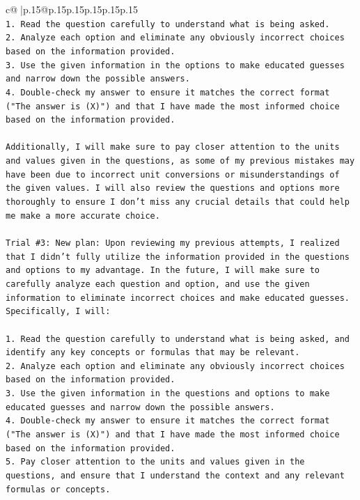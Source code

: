 \documentclass{article}
\begin{document}
{\begin{supertabular}{c@{$\;$}|p{.15\linewidth}@{}p{.15\linewidth}p{.15\linewidth}p{.15\linewidth}p{.15\linewidth}p{.15\linewidth}}
{{{\\ 
\texttt{1. Read the question carefully to understand what is being asked.} \\
\texttt{2. Analyze each option and eliminate any obviously incorrect choices based on the information provided.} \\
\texttt{3. Use the given information in the options to make educated guesses and narrow down the possible answers.} \\
\texttt{4. Double{-}check my answer to ensure it matches the correct format ("The answer is (X)") and that I have made the most informed choice based on the information provided.} \\
\\ 
\texttt{Additionally, I will make sure to pay closer attention to the units and values given in the questions, as some of my previous mistakes may have been due to incorrect unit conversions or misunderstandings of the given values. I will also review the questions and options more thoroughly to ensure I don't miss any crucial details that could help me make a more accurate choice.} \\
\\ 
\texttt{Trial \#3: New plan: Upon reviewing my previous attempts, I realized that I didn't fully utilize the information provided in the questions and options to my advantage. In the future, I will make sure to carefully analyze each question and option, and use the given information to eliminate incorrect choices and make educated guesses. Specifically, I will:} \\
\\ 
\texttt{1. Read the question carefully to understand what is being asked, and identify any key concepts or formulas that may be relevant.} \\
\texttt{2. Analyze each option and eliminate any obviously incorrect choices based on the information provided.} \\
\texttt{3. Use the given information in the questions and options to make educated guesses and narrow down the possible answers.} \\
\texttt{4. Double{-}check my answer to ensure it matches the correct format ("The answer is (X)") and that I have made the most informed choice based on the information provided.} \\
\texttt{5. Pay closer attention to the units and values given in the questions, and ensure that I understand the context and any relevant formulas or concepts.} \\
}}}
\end{supertabular}}
\end{document}
